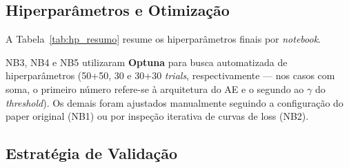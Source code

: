 \documentclass[12pt]{article}
\begin{document}
\subsection{Hiperparâmetros e Otimização}

A Tabela~\ref{tab:hp_resumo} resume os hiperparâmetros finais por \textit{notebook}.

\begin{table}[!ht]
\centering
\small
{}
\caption{Hiperparâmetros finais por notebook.}
\label{tab:hp_resumo}
\end{table}

NB3, NB4 e NB5 utilizaram \textbf{Optuna} para busca automatizada de hiperparâmetros (50+50, 30 e 30+30 \textit{trials}, respectivamente --- nos casos com soma, o primeiro número refere-se à arquitetura do AE e o segundo ao $\gamma$ do \textit{threshold}). Os demais foram ajustados manualmente seguindo a configuração do paper original (NB1) ou por inspeção iterativa de curvas de loss (NB2).

\subsection{Estratégia de Validação}\label{subsec:validacao}
\end{document}
